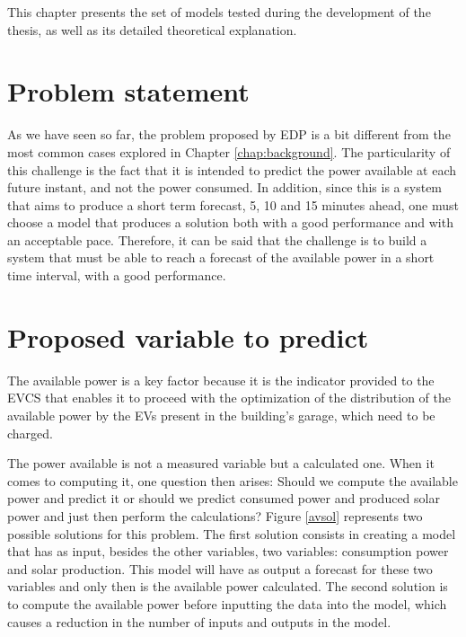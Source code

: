 \cleardoublepage
\label{chap:Model}

This chapter presents the set of models tested during the development of the thesis, as well as its detailed theoretical explanation.

\section{Problem statement} \label{chap4:ps}

As we have seen so far, the problem proposed by \ac{EDP} is a bit different from the most common cases explored in Chapter \ref{chap:background}. The particularity of this challenge is the fact that it is intended to predict the power available at each future instant, and not the power consumed. In addition, since this is a system that aims to produce a short term forecast, 5, 10 and 15 minutes ahead, one must choose a model that produces a solution both with a good performance and with an acceptable pace. Therefore, it can be said that the challenge is to build a system that must be able to reach a forecast of the available power in a short time interval, with a good performance.


\section{Proposed variable to predict}\label{chap4:vtp}

The available power is a key factor because it is the indicator provided to the \ac{EVCS} that enables it to proceed with the optimization of the distribution of the available power by the \ac{EV}s present in the building's garage, which need to be charged.

The power available is not a measured variable but a calculated one. When it comes to computing it, one question then arises: Should we compute the available power and predict it or should we predict consumed power and produced solar power and just then perform the calculations? Figure \ref{avsol} represents two possible solutions for this problem. The first solution consists in creating a model that has as input, besides the other variables, two variables: consumption power and solar production. This model will have as output a forecast for these two variables and only then is the available power calculated. The second solution is to compute the available power before inputting the data into the model, which causes a reduction in the number of inputs and outputs in the model. 


